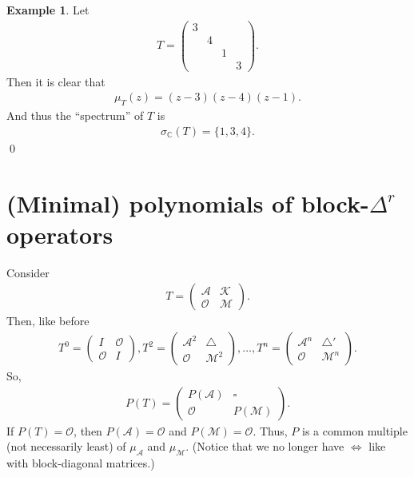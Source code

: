 \documentclass{book}
\theoremstyle{definition}
\newtheorem{exmp}{Example}[section]
\newcommand{\A}{\mathcal{A}}
\newcommand{\M}{\mathcal{M}}
\newcommand{\K}{\mathcal{K}}
\begin{document}
\begin{exmp}
	Let 
	\begin{align*}
	T = \begin{pmatrix}
	3 &&&\\
	&4&&\\
	&&1&\\
	&&&3
	\end{pmatrix}.
	\end{align*}
	Then it is clear that 
	\begin{align*}
	\mu_T(z) = (z-3)(z-4)(z-1).
	\end{align*}
	And thus the ``spectrum'' of $T$ is 
	\begin{align*}
	\sigma_{\mathbb{C}}(T) = \{1,3,4\}.
	\end{align*}
	\qed
\end{exmp}








\section{(Minimal) polynomials of block-$\Delta^r$ operators}


Consider 
\begin{align*}
T = \begin{pmatrix}
\A & \K \\
\mathcal{O} & \M
\end{pmatrix}.
\end{align*}
Then, like before
\begin{align*}
T^0 = \begin{pmatrix}
I & \mathcal{O}\\
\mathcal{O} & I
\end{pmatrix}, 
T^2 = \begin{pmatrix}
\A^2 & \triangle\\
\mathcal{O} & \M^2
\end{pmatrix}, 
\dots,
T^n = \begin{pmatrix}
\A^n & \triangle'\\
\mathcal{O} & \M^n
\end{pmatrix}.
\end{align*}
So, 
\begin{align*}
P(T) = \begin{pmatrix}
P(\A) & \square\\
\mathcal{O} & P(\M)
\end{pmatrix}.
\end{align*}
If $P(T) = \mathcal{O}$, then $P(\A) = \mathcal{O}$ and $P(\M) = \mathcal{O}$. Thus, $P$ is a common multiple (not necessarily least) of $\mu_\A$ and $\mu_\M$. (Notice that we no longer have $\iff$ like with block-diagonal matrices.) 
\end{document}
